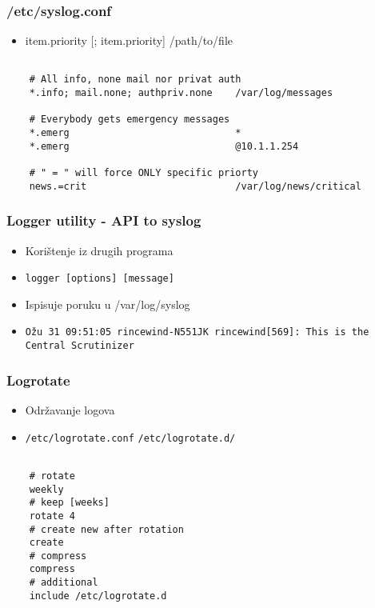 \documentclass[t,table,usenames,dvipsnames]{beamer}
\newcommand{\shell}[1]{\texttt{#1}}
\begin{document}
\begin{frame}[fragile]
    \frametitle{/etc/syslog.conf}
    \begin{itemize}
        \item item.priority [; item.priority]   /path/to/file
    \end{itemize}
    \begin{verbatim}

    # All info, none mail nor privat auth
    *.info; mail.none; authpriv.none    /var/log/messages

    # Everybody gets emergency messages
    *.emerg                             *
    *.emerg                             @10.1.1.254
    
    # " = " will force ONLY specific priorty
    news.=crit                          /var/log/news/critical

    \end{verbatim}

\end{frame}

\begin{frame}[fragile]
    \frametitle{Logger utility - API to syslog}

    \begin{itemize}
        \item Korištenje iz drugih programa

        \item \shell{logger [options] [message]}
        \item Ispisuje poruku u /var/log/syslog

        \item \shell{Ožu 31 09:51:05 rincewind-N551JK rincewind[569]: This is the Central Scrutinizer}

    \end{itemize}

\end{frame}

\begin{frame}[fragile]
    \frametitle{Logrotate}
    \begin{itemize}
        \item Održavanje logova
        \item \shell{/etc/logrotate.conf} \shell{/etc/logrotate.d/}
    \end{itemize}

    \begin{verbatim}

    # rotate
    weekly
    # keep [weeks]
    rotate 4
    # create new after rotation
    create
    # compress
    compress
    # additional
    include /etc/logrotate.d

    \end{verbatim}

\end{frame}
\end{document}
